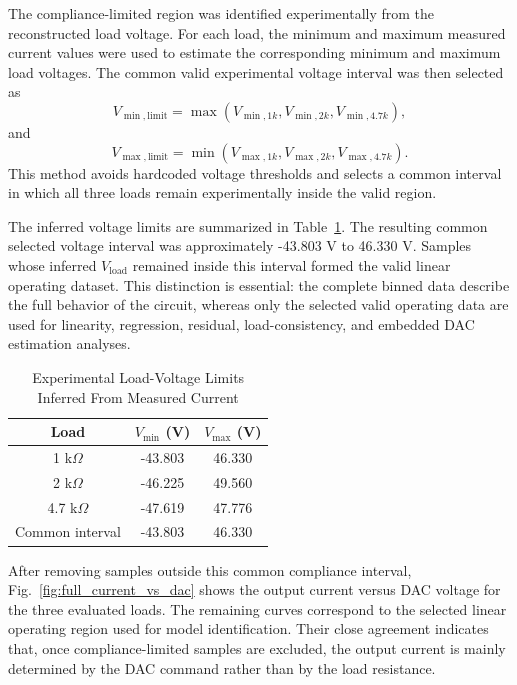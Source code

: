 \documentclass[conference]{IEEEtran}
\begin{document}
The compliance-limited region was identified experimentally from the reconstructed load voltage. For each load, the minimum and maximum measured current values were used to estimate the corresponding minimum and maximum load voltages. The common valid experimental voltage interval was then selected as
\begin{equation}
V_{\min,\mathrm{limit}} = \max(V_{\min,1k}, V_{\min,2k}, V_{\min,4.7k}),
\label{eq:vmin_limit}
\end{equation}
and
\begin{equation}
V_{\max,\mathrm{limit}} = \min(V_{\max,1k}, V_{\max,2k}, V_{\max,4.7k}).
\label{eq:vmax_limit}
\end{equation}
This method avoids hardcoded voltage thresholds and selects a common interval in which all three loads remain experimentally inside the valid region.

The inferred voltage limits are summarized in Table~\ref{tab:voltage_limits}. The resulting common selected voltage interval was approximately -43.803 V to 46.330 V. Samples whose inferred $V_{\mathrm{load}}$ remained inside this interval formed the valid linear operating dataset. This distinction is essential: the complete binned data describe the full behavior of the circuit, whereas only the selected valid operating data are used for linearity, regression, residual, load-consistency, and embedded DAC estimation analyses.

\begin{table}[H]
\caption{Experimental Load-Voltage Limits Inferred From Measured Current}
\begin{center}
\begin{tabular}{|c|c|c|}
\hline
\textbf{Load} & \textbf{$V_{\min}$ (V)} & \textbf{$V_{\max}$ (V)} \\
\hline
1 k$\Omega$ & -43.803 & 46.330 \\
\hline
2 k$\Omega$ & -46.225 & 49.560 \\
\hline
4.7 k$\Omega$ & -47.619 & 47.776 \\
\hline
Common interval & -43.803 & 46.330 \\
\hline
\end{tabular}
\label{tab:voltage_limits}
\end{center}
\end{table}

After removing samples outside this common compliance interval, Fig.~\ref{fig:full_current_vs_dac} shows the output current versus DAC voltage for the three evaluated loads. The remaining curves correspond to the selected linear operating region used for model identification. Their close agreement indicates that, once compliance-limited samples are excluded, the output current is mainly determined by the DAC command rather than by the load resistance.
\end{document}
